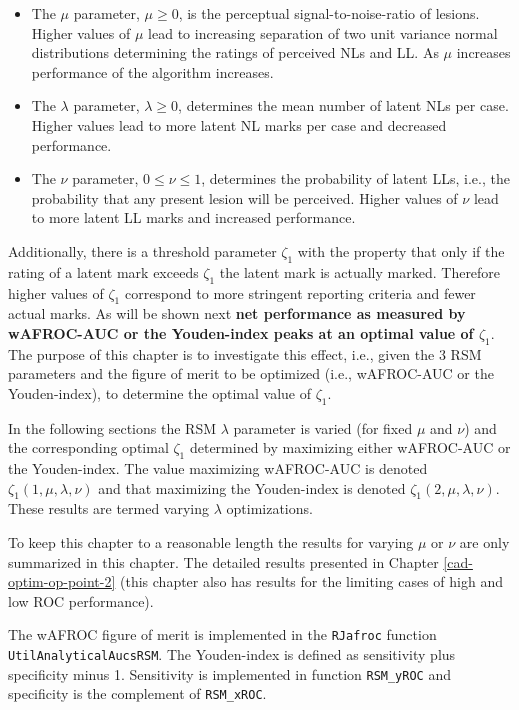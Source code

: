 \documentclass[
]{book}
\begin{document}
\begin{itemize}
\item
  The \(\mu\) parameter, \(\mu \ge 0\), is the perceptual signal-to-noise-ratio of lesions. Higher values of \(\mu\) lead to increasing separation of two unit variance normal distributions determining the ratings of perceived NLs and LL. As \(\mu\) increases performance of the algorithm increases.
\item
  The \(\lambda\) parameter, \(\lambda \ge 0\), determines the mean number of latent NLs per case. Higher values lead to more latent NL marks per case and decreased performance.
\item
  The \(\nu\) parameter, \(0 \le \nu \le 1\), determines the probability of latent LLs, i.e., the probability that any present lesion will be perceived. Higher values of \(\nu\) lead to more latent LL marks and increased performance.
\end{itemize}

Additionally, there is a threshold parameter \(\zeta_1\) with the property that only if the rating of a latent mark exceeds \(\zeta_1\) the latent mark is actually marked. Therefore higher values of \(\zeta_1\) correspond to more stringent reporting criteria and fewer actual marks. As will be shown next \textbf{net performance as measured by wAFROC-AUC or the Youden-index peaks at an optimal value of \(\zeta_1\)}. The purpose of this chapter is to investigate this effect, i.e., given the 3 RSM parameters and the figure of merit to be optimized (i.e., wAFROC-AUC or the Youden-index), to determine the optimal value of \(\zeta_1\).

In the following sections the RSM \(\lambda\) parameter is varied (for fixed \(\mu\) and \(\nu\)) and the corresponding optimal \(\zeta_1\) determined by maximizing either wAFROC-AUC or the Youden-index. The value maximizing wAFROC-AUC is denoted \(\zeta_{1} \left ( 1, \mu, \lambda, \nu \right )\) and that maximizing the Youden-index is denoted \(\zeta_{1} \left ( 2, \mu, \lambda, \nu \right )\). These results are termed varying \(\lambda\) optimizations.

To keep this chapter to a reasonable length the results for varying \(\mu\) or \(\nu\) are only summarized in this chapter. The detailed results presented in Chapter \ref{cad-optim-op-point-2} (this chapter also has results for the limiting cases of high and low ROC performance).

The wAFROC figure of merit is implemented in the \texttt{RJafroc} function \texttt{UtilAnalyticalAucsRSM}. The Youden-index is defined as sensitivity plus specificity minus 1. Sensitivity is implemented in function \texttt{RSM\_yROC} and specificity is the complement of \texttt{RSM\_xROC}.
\end{document}

